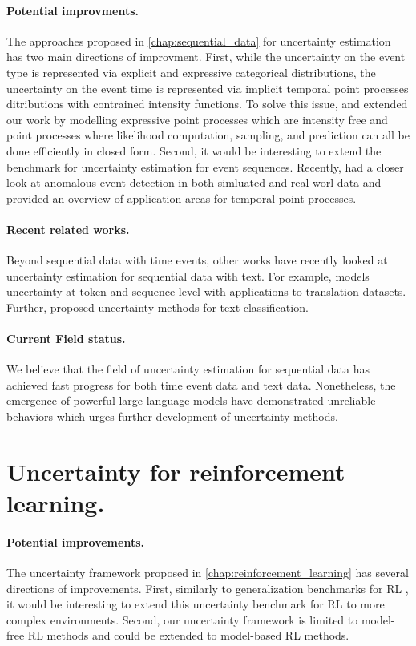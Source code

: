 \paragraph{Potential improvments.} The approaches proposed in \cref{chap:sequential_data} for uncertainty estimation has two main directions of improvment. First, while the uncertainty on the event type is represented via explicit and expressive categorical distributions, the uncertainty on the event time is represented via implicit temporal point processes ditributions with contrained intensity functions. To solve this issue, \cite{shchur2020intensity} and \cite{shchur2020fast} extended our work by modelling expressive point processes which are intensity free and point processes where likelihood computation, sampling, and prediction can all be done efficiently in closed form. Second, it would be interesting to extend the benchmark for uncertainty estimation for event sequences. Recently, \cite{shchur2021detecting} had a closer look at anomalous event detection in both simluated and real-worl data and \cite{shchur2021review} provided an overview of application areas for temporal point processes. 

\paragraph{Recent related works.} Beyond sequential data with time events, other works have recently looked at uncertainty estimation for sequential data with text. For example, \cite{malinin2021uncertainty} models uncertainty at token and sequence level with applications to translation datasets. Further, \cite{he2020toward, hu2021uncertainty} proposed uncertainty methods for text classification.

\paragraph{Current Field status.} We believe that the field of uncertainty estimation for sequential data has achieved fast progress for both time event data and text data. Nonetheless, the emergence of powerful large language models have demonstrated unreliable behaviors which urges further development of uncertainty methods. 

\section{Uncertainty for reinforcement learning.}

\paragraph{Potential improvements.} The uncertainty framework proposed in \cref{chap:reinforcement_learning} has several directions of improvements. First, similarly to generalization benchmarks for RL \cite{generalization-rl-survey, assessing-generalization-rl, procgen}, it would be interesting to extend this uncertainty benchmark for RL to more complex environments. Second, our uncertainty framework is limited to model-free RL methods and could be extended to model-based RL methods. 

